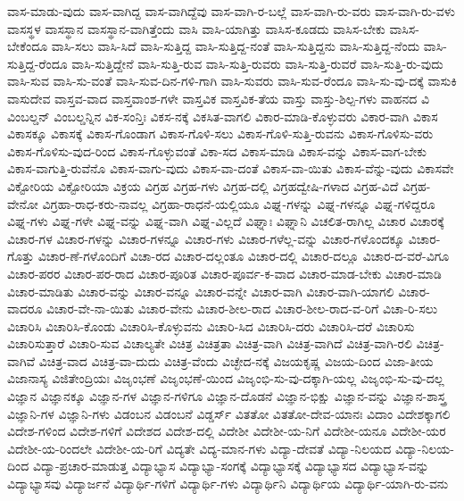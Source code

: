 {ವಾಸ-ಮಾಡು-ವುದು
ವಾಸ-ವಾಗಿದ್ದ
ವಾಸ-ವಾಗಿದ್ದೆವು
ವಾಸ-ವಾಗಿ-ರ-ಬಲ್ಲೆ
ವಾಸ-ವಾಗಿ-ರು-ವರು
ವಾಸ-ವಾಗಿ-ರು-ವಳು
ವಾಸಸ್ಥಳ
ವಾಸಸ್ಥಾನ
ವಾಸಸ್ಥಾನ-ವಾಗಿತ್ತೆಂದು
ವಾಸಿ
ವಾಸಿ-ಯಾಗಿತ್ತು
ವಾಸಿಸ-ಕೂಡದು
ವಾಸಿಸ-ಬೇಕು
ವಾಸಿಸ-ಬೇಕೆಂದೂ
ವಾಸಿ-ಸಲು
ವಾಸಿ-ಸಿದೆ
ವಾಸಿ-ಸುತ್ತಿದ್ದ
ವಾಸಿ-ಸುತ್ತಿದ್ದ-ನಂತೆ
ವಾಸಿ-ಸುತ್ತಿದ್ದನು
ವಾಸಿ-ಸುತ್ತಿದ್ದ-ನೆಂದು
ವಾಸಿ-ಸುತ್ತಿದ್ದ-ರೆಂದೂ
ವಾಸಿ-ಸುತ್ತಿದ್ದೇನೆ
ವಾಸಿ-ಸುತ್ತಿ-ರುವ
ವಾಸಿ-ಸುತ್ತಿ-ರುವರು
ವಾಸಿ-ಸುತ್ತಿ-ರುವರೆ
ವಾಸಿ-ಸುತ್ತಿ-ರು-ವುದು
ವಾಸಿ-ಸುವ
ವಾಸಿ-ಸು-ವಂತೆ
ವಾಸಿ-ಸುವ-ದಿನ-ಗಳಿ-ಗಾಗಿ
ವಾಸಿ-ಸುವರು
ವಾಸಿ-ಸುವ-ರೆಂದೂ
ವಾಸಿ-ಸು-ವು-ದಕ್ಕೆ
ವಾಸುಕಿ
ವಾಸುದೇವ
ವಾಸ್ತವ-ವಾದ
ವಾಸ್ತವಾಂಶ-ಗಳೇ
ವಾಸ್ತವಿಕ
ವಾಸ್ತವಿಕ-ತೆಯ
ವಾಸ್ತು
ವಾಸ್ತು-ಶಿಲ್ಪ-ಗಳು
ವಾಹನದ
ವಿ
ವಿಂಬಲ್ಡನ್
ವಿಂಬಲ್ಡನ್ನಿನ
ವಿಕ-ಸಂನ್ತಿಃ
ವಿಕಸ-ನಕ್ಕೆ
ವಿಕಸಿತ-ವಾಗಲಿ
ವಿಕಾರ-ಮಾಡಿ-ಕೊಳ್ಳುವರು
ವಿಕಾರ-ವಾಗಿ
ವಿಕಾಸ
ವಿಕಾಸಕ್ಕೂ
ವಿಕಾಸಕ್ಕೆ
ವಿಕಾಸ-ಗೊಂಡಾಗ
ವಿಕಾಸ-ಗೊಳಿ-ಸಲು
ವಿಕಾಸ-ಗೊಳಿ-ಸುತ್ತಿ-ರುವನು
ವಿಕಾಸ-ಗೊಳಿಸು-ವರು
ವಿಕಾಸ-ಗೊಳಿಸು-ವುದ-ರಿಂದ
ವಿಕಾಸ-ಗೊಳ್ಳುವಂತೆ
ವಿಕಾ-ಸದ
ವಿಕಾಸ-ಮಾಡಿ
ವಿಕಾಸ-ವನ್ನು
ವಿಕಾಸ-ವಾಗ-ಬೇಕು
ವಿಕಾಸ-ವಾಗುತ್ತಿ-ರುವೆನೊ
ವಿಕಾಸ-ವಾಗು-ವುದು
ವಿಕಾಸ-ವಾ-ದಂತೆ
ವಿಕಾಸ-ವಾ-ಯಿತು
ವಿಕಾಸ-ವೆನ್ನು-ವುದು
ವಿಕಾಸವೇ
ವಿಕ್ಟೋರಿಯ
ವಿಕ್ಟೋರಿಯಾ
ವಿಕ್ರಯ
ವಿಗ್ರಹ
ವಿಗ್ರಹ-ಗಳು
ವಿಗ್ರಹ-ದಲ್ಲಿ
ವಿಗ್ರಹದ್ವೇಷಿ-ಗಳಾದ
ವಿಗ್ರಹ-ವಿದೆ
ವಿಗ್ರಹ-ವೇನೋ
ವಿಗ್ರಹಾ-ರಾಧ-ಕರು-ನಾವಲ್ಲ
ವಿಗ್ರಹಾ-ರಾಧನೆ-ಯಲ್ಲಿಯೂ
ವಿಘ್ನ-ಗಳನ್ನು
ವಿಘ್ನ-ಗಳನ್ನೂ
ವಿಘ್ನ-ಗಳಿದ್ದರೂ
ವಿಘ್ನ-ಗಳು
ವಿಘ್ನ-ಗಳೇ
ವಿಘ್ನ-ವನ್ನು
ವಿಘ್ನ-ವಾಗಿ
ವಿಘ್ನ-ವಿಲ್ಲದೆ
ವಿಘ್ನಾಃ
ವಿಘ್ನಾನಿ
ವಿಚಲಿತ-ರಾಗಿಲ್ಲ
ವಿಚಾರ
ವಿಚಾರಕ್ಕೆ
ವಿಚಾರ-ಗಳ
ವಿಚಾರ-ಗಳನ್ನು
ವಿಚಾರ-ಗಳನ್ನೂ
ವಿಚಾರ-ಗಳು
ವಿಚಾರ-ಗಳೆಲ್ಲ-ವನ್ನು
ವಿಚಾರ-ಗಳೊಂದಕ್ಕೂ
ವಿಚಾರ-ಗೊತ್ತು
ವಿಚಾರ-ಣೆ-ಗಳೊಂದಿಗೆ
ವಿಚಾ-ರದ
ವಿಚಾರ-ದಲ್ಲಂತೂ
ವಿಚಾರ-ದಲ್ಲಿ
ವಿಚಾರ-ದಲ್ಲೂ
ವಿಚಾರ-ದ-ವರೆ-ವಿಗೂ
ವಿಚಾರ-ಪರರ
ವಿಚಾರ-ಪರ-ರಾದ
ವಿಚಾರ-ಪೂರಿತ
ವಿಚಾರ-ಪೂರ್ವ-ಕ-ವಾದ
ವಿಚಾರ-ಮಾಡ-ಬೇಕು
ವಿಚಾರ-ಮಾಡಿ
ವಿಚಾರ-ಮಾಡಿತು
ವಿಚಾರ-ವನ್ನು
ವಿಚಾರ-ವನ್ನೂ
ವಿಚಾರ-ವನ್ನೇ
ವಿಚಾರ-ವಾಗಿ
ವಿಚಾರ-ವಾಗಿ-ಯಾಗಲಿ
ವಿಚಾರ-ವಾದರೂ
ವಿಚಾರ-ವೇ-ನಾ-ಯಿತು
ವಿಚಾರ-ವೇನು
ವಿಚಾರ-ಶೀಲ-ರಾದ
ವಿಚಾರ-ಶೀಲ-ರಾದ-ವ-ರಿಗೆ
ವಿಚಾ-ರಿ-ಸಲು
ವಿಚಾರಿಸಿ
ವಿಚಾರಿಸಿ-ಕೊಂಡು
ವಿಚಾರಿಸಿ-ಕೊಳ್ಳುವನು
ವಿಚಾರಿ-ಸಿದ
ವಿಚಾರಿಸಿ-ದರು
ವಿಚಾರಿಸಿ-ದರೆ
ವಿಚಾರಿಸು
ವಿಚಾರಿಸುತ್ತಾರೆ
ವಿಚಾರಿ-ಸುವ
ವಿಚಾಲ್ಯತೇ
ವಿಚಿತ್ರ
ವಿಚಿತ್ರತಾ
ವಿಚಿತ್ರ-ವಾಗಿ
ವಿಚಿತ್ರ-ವಾಗಿದೆ
ವಿಚಿತ್ರ-ವಾಗಿ-ರಲಿ
ವಿಚಿತ್ರ-ವಾಗಿವೆ
ವಿಚಿತ್ರ-ವಾದ
ವಿಚಿತ್ರ-ವಾ-ದುದು
ವಿಚಿತ್ರ-ವೆಂದು
ವಿಚ್ಛೇದ-ನಕ್ಕೆ
ವಿಜಯಕೃಷ್ಣ
ವಿಜಯ-ದಿಂದ
ವಿಜಾ-ತೀಯ
ವಿಜಾನಾಸ್ಯ
ವಿಜಿತೇಂದ್ರಿಯಃ
ವಿಜೃಂಭಣೆ
ವಿಜೃಂಭಣೆ-ಯಿಂದ
ವಿಜೃಂಭಿ-ಸು-ವು-ದಕ್ಕಾಗಿ-ಯಲ್ಲ
ವಿಜೃಂಭಿ-ಸು-ವು-ದಲ್ಲ
ವಿಜ್ಞಾನ
ವಿಜ್ಞಾನಕ್ಕೂ
ವಿಜ್ಞಾನ-ಗಳ
ವಿಜ್ಞಾನ-ಗಳಿಗೂ
ವಿಜ್ಞಾನ-ದೊಡನೆ
ವಿಜ್ಞಾನ-ಭಿಕ್ಷು
ವಿಜ್ಞಾನ-ವನ್ನು
ವಿಜ್ಞಾನ-ಶಾಸ್ತ್ರ
ವಿಜ್ಞಾನಿ-ಗಳ
ವಿಜ್ಞಾನಿ-ಗಳು
ವಿಡಂಬನ
ವಿಡಂಬನೆ
ವಿಡ್ಡರ್ಸ್
ವಿತತೋ
ವಿತತೋ-ದೇವ-ಯಾನಃ
ವಿದಾಂ
ವಿದೇಶಕ್ಕಾಗಲಿ
ವಿದೇಶ-ಗಳಿಂದ
ವಿದೇಶ-ಗಳಿಗೆ
ವಿದೇಶದ
ವಿದೇಶ-ದಲ್ಲಿ
ವಿದೇಶೀ
ವಿದೇಶೀ-ಯ-ನಿಗೆ
ವಿದೇಶೀ-ಯನೂ
ವಿದೇಶೀ-ಯರ
ವಿದೇಶೀ-ಯ-ರಿಂದಲೇ
ವಿದೇಶೀ-ಯ-ರಿಗೆ
ವಿದ್ಯತೇ
ವಿದ್ಯ-ಮಾನ-ಗಳು
ವಿದ್ಯಾ-ದೇವತೆ
ವಿದ್ಯಾ-ನಿಲಯದ
ವಿದ್ಯಾ-ನಿಲಯ-ದಿಂದ
ವಿದ್ಯಾ-ಪ್ರಚಾರ-ಮಾಡುತ್ತ
ವಿದ್ಯಾಭ್ಯಾಸ
ವಿದ್ಯಾಭ್ಯಾ-ಸಂಗಕ್ಕೆ
ವಿದ್ಯಾಭ್ಯಾಸಕ್ಕೆ
ವಿದ್ಯಾಭ್ಯಾಸದ
ವಿದ್ಯಾಭ್ಯಾಸ-ವನ್ನು
ವಿದ್ಯಾಭ್ಯಾಸವು
ವಿದ್ಯಾರ್ಜನೆ
ವಿದ್ಯಾರ್ಥಿ-ಗಳಿಗೆ
ವಿದ್ಯಾರ್ಥಿ-ಗಳು
ವಿದ್ಯಾರ್ಥಿನಿ
ವಿದ್ಯಾರ್ಥಿಯ
ವಿದ್ಯಾರ್ಥಿ-ಯಾಗಿ-ರು-ವನು
}
